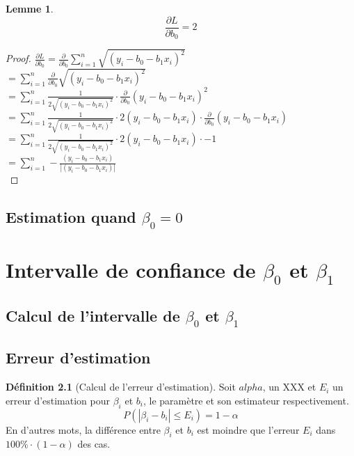 \documentclass[12pt]{book}
\newcommand\todo[1]{\phantom{#1}}
\theoremstyle{definition}
\newtheorem{definition}{Définition}[section]
\newtheorem{lemma}[theorem]{Lemme}
\begin{document}
\begin{lemma}
    $$ \frac{\partial L}{\partial b_0} = 2 $$
\end{lemma}
\begin{proof}
    $\frac{\partial L}{\partial b_0} = \frac{\partial}{\partial b_0} \sum_{i=1}^{n} \sqrt{(y_i - b_0 - b_1x_i)^2} $\\
    $ = \sum_{i=1}^{n} \frac{\partial}{\partial b_0} \sqrt{(y_i - b_0 - b_1x_i)^2} $\\
    $ = \sum_{i=1}^{n} \frac{1}{2 \sqrt{(y_i - b_0 - b_1x_i)^2}} \cdot \frac{\partial}{\partial b_0} (y_i - b_0 - b_1x_i)^2 $\\
    $ = \sum_{i=1}^{n} \frac{1}{2 \sqrt{(y_i - b_0 - b_1x_i)^2}} \cdot 2 (y_i - b_0 - b_1x_i) \cdot \frac{\partial}{\partial b_0} (y_i - b_0 - b_1x_i) $\\
    $ = \sum_{i=1}^{n} \frac{1}{2 \sqrt{(y_i - b_0 - b_1x_i)^2}} \cdot 2 (y_i - b_0 - b_1x_i) \cdot -1 $\\
    $ = \sum_{i=1}^{n} -\frac{(y_i - b_0 - b_1x_i)}{|(y_i - b_0 - b_1x_i)|} $\\
\end{proof}

\section{Estimation quand $\beta_0 = 0$}

\chapter{Intervalle de confiance de $\beta_0$ et $\beta_1$}
\section{Calcul de l'intervalle de $\beta_0$ et $\beta_1$}
\section{Erreur d'estimation}
\begin{definition}[Calcul de l'erreur d'estimation]
    \label{def:calcul_erreur_estimation}
    Soit $alpha$, un XXX \todo{Add name + link} et $E_i$ un erreur d'estimation 
    \todo{Add link} pour $\beta_i$ et $b_i$, le paramètre et son estimateur respectivement.
    $$ P(|\beta_i - b_i| \leq E_i) = 1 - \alpha $$
    En d'autres mots, la différence entre $\beta_i$ et $b_i$ est moindre que l'erreur $E_i$ dans
    $100\% \cdot (1 - \alpha)$ des cas.
\end{definition}
\end{document}
